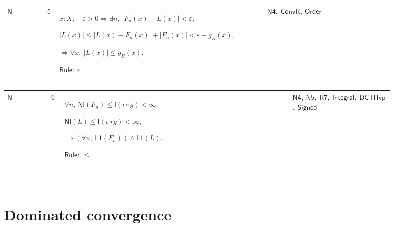 \documentclass[12pt,reqno]{amsart}
\theoremstyle{blueplain}
\numberwithin{equation}{section}
\begin{document}
{\scriptsize \setlength{\parskip}{0pt}\nointerlineskip
\noindent 
\begin{tabular}{|@{}>{\centering\arraybackslash}m{0.10658\linewidth}|>{\centering\arraybackslash}m{0.03553\linewidth}|>{\centering\arraybackslash}m{0.52105\linewidth}|>{\centering\arraybackslash}m{0.23684\linewidth}|}
\hline
\hypertarget{dct:N5}{$\displaystyle \mathsf{N}$} & $\displaystyle 5$ & $%
\displaystyle x:X,\quad\varepsilon>0\Rightarrow\exists n,\
|F_n(x)-L(x)|<\varepsilon,$\par$\displaystyle |L(x)|%
\le|L(x)-F_n(x)|+|F_n(x)|<\varepsilon+g_R(x),$\par$\displaystyle %
\Rightarrow\forall x,\ |L(x)|\le g_R(x).$\par$\displaystyle \mathsf{Rule}:\
\varepsilon$ & \hyperlink{dct:N4}{$\displaystyle \mathsf{N4}$}, \hyperlink{dctdef:ConvR}%
{$\displaystyle \mathsf{ConvR}$}, \hyperlink{ax:Order}{$\displaystyle 
\mathsf{Order}$} \\ \hline
\end{tabular}%
}

{\scriptsize \setlength{\parskip}{0pt}\nointerlineskip
\noindent 
\begin{tabular}{|@{}>{\centering\arraybackslash}m{0.10658\linewidth}|>{\centering\arraybackslash}m{0.03553\linewidth}|>{\centering\arraybackslash}m{0.52105\linewidth}|>{\centering\arraybackslash}m{0.23684\linewidth}|}
\hline
\hypertarget{dct:N6}{$\displaystyle \mathsf{N}$} & $\displaystyle 6$ & $%
\displaystyle \forall n,\ \mathsf{NI}(F_n)\le\mathsf{I}(\iota\circ g)<\infty,
$\par$\displaystyle \mathsf{NI}(L)\le\mathsf{I}(\iota\circ g)<\infty,$\par$%
\displaystyle \Rightarrow(\forall n,\ \mathsf{L1}(F_n))\land\mathsf{L1}(L).$%
\par$\displaystyle \mathsf{Rule}:\ \le$ & \hyperlink{dct:N4}{$\displaystyle 
\mathsf{N4}$}, \hyperlink{dct:N5}{$\displaystyle \mathsf{N5}$}, \hyperlink{dct:R7}%
{$\displaystyle \mathsf{R7}$}, \hyperlink{lem:Integral}{$\displaystyle 
\mathsf{Integral}$}, \hyperlink{dctdef:DCTHyp}{$\displaystyle \mathsf{DCTHyp}
$}, \hyperlink{dctdef:Signed}{$\displaystyle \mathsf{Signed}$} \\ \hline
\end{tabular}%
}

{\scriptsize \ }

\section{\protect\scriptsize Dominated convergence}
\end{document}
